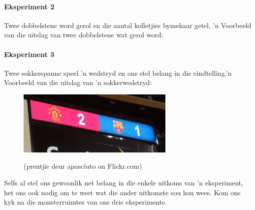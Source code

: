\paragraph{Eksperiment 2} Twee dobbelstene word gerol en die aantal kolletjies bymekaar getel. 'n Voorbeeld van die uitslag van twee dobbelstene wat gerol word:

\begin{figure}[h]
  \begin{center}
  \end{center}
\end{figure}

\paragraph{Eksperiment 3} Twee sokkerspanne speel 'n wedstryd en ons stel belang in die eindtelling.'n Voorbeeld van die uitslag van 'n sokkerwedstryd:

\begin{figure}[h]
  \begin{center}
    \includegraphics[width=3in]{Gr10-Probability-images/5996076302_412ec8d8d0_o.jpg}
 \\
  \begin{caption*}{(prentjie deur apasciuto on Flickr.com)}\end{caption*}
 \end{center}
\end{figure}


Selfs al stel ons gewoonlik net belang in die enkele uitkoms van 'n eksperiment, het ons ook nodig om te weet wat die ander uitkomste sou kon wees. Kom ons kyk na die monsterruimtes van ons drie eksperimente.


